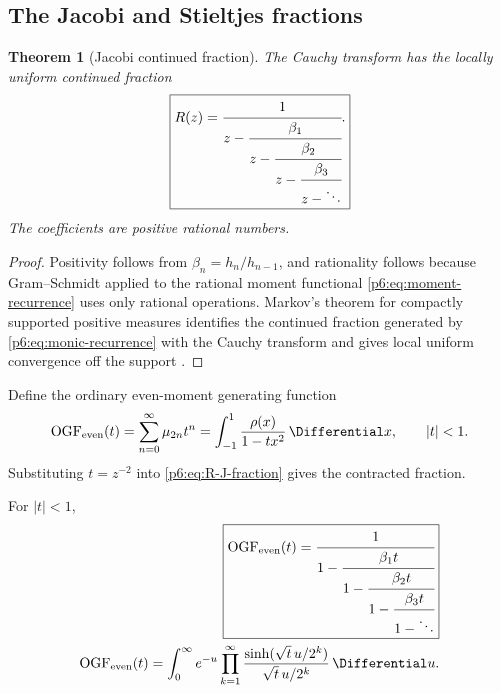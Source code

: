 \documentclass[11pt]{article}
\newtheorem{theorem}{Theorem}[section]
\theoremstyle{definition}
\theoremstyle{remark}
\newcommand{\EvenMomentOrdinaryGeneratingFunction}{\operatorname{OGF}_{\mathrm{even}}}
\begin{document}
\subsection{The Jacobi and Stieltjes fractions}

\begin{theorem}[Jacobi continued fraction]\label{p6:thm:J-fraction}
The Cauchy transform has the locally uniform continued fraction
\begin{equation}
 \boxed{
 R(z)=\cfrac{1}{z-\cfrac{\beta_1}{z-\cfrac{\beta_2}{z-
           \cfrac{\beta_3}{z-\ddots}}}}.
 }                                                           \label{p6:eq:R-J-fraction}
\end{equation}
The coefficients are positive rational numbers.
\end{theorem}

\begin{proof}
Positivity follows from \(\beta_n=h_n/h_{n-1}\), and rationality follows because
Gram--Schmidt applied to the rational moment functional \eqref{p6:eq:moment-recurrence}
uses only rational operations.  Markov's theorem for compactly supported positive measures
identifies the continued fraction generated by \eqref{p6:eq:monic-recurrence} with the Cauchy
transform and gives local uniform convergence off the support \cite{p6:VanAssche1993,p6:SimonOPRL}.
\end{proof}

Define the ordinary even-moment generating function
\begin{equation}
 \EvenMomentOrdinaryGeneratingFunction(t)=\sum_{n=0}^{\infty}\mu_{2n}t^n
 =\int_{-1}^{1}\frac{\rho(x)}{1-tx^2}\,\Differential x,
 \qquad |t|<1.                                               \label{p6:eq:O-def}
\end{equation}
Substituting \(t=z^{-2}\) into \eqref{p6:eq:R-J-fraction} gives the contracted fraction.

\begin{corollary}\label{p6:cor:S-fraction}
For \(|t|<1\),
\begin{align}
 \boxed{
 \EvenMomentOrdinaryGeneratingFunction(t)=\cfrac{1}{1-\cfrac{\beta_1t}{1-\cfrac{\beta_2t}{1-
               \cfrac{\beta_3t}{1-\ddots}}}}
 }                                                           \label{p6:eq:O-S-fraction}\\
 \EvenMomentOrdinaryGeneratingFunction(t)=\int_0^{\infty}e^{-u}
 \prod_{k=1}^{\infty}
 \frac{\sinh(\sqrt t\,u/2^k)}{\sqrt t\,u/2^k}\,\Differential u.    \label{p6:eq:O-product-integral}
\end{align}
\end{corollary}
\end{document}
